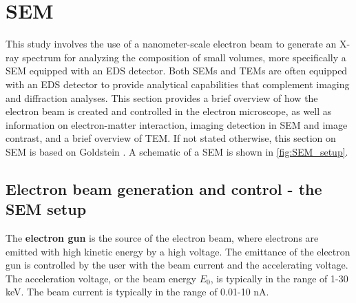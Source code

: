 


























\clearpage

\section{SEM}
\label{theory:sem}

This study involves the use of a nanometer-scale electron beam to generate an X-ray spectrum for analyzing the composition of small volumes, more specifically a SEM equipped with an EDS detector.
Both SEMs and TEMs are often equipped with an EDS detector to provide analytical capabilities that complement imaging and diffraction analyses.
This section provides a brief overview of how the electron beam is created and controlled in the electron microscope, as well as information on electron-matter interaction, imaging detection in SEM and image contrast, and a brief overview of TEM.
If not stated otherwise, this section on SEM is based on Goldstein \cite{goldstein_scanning_2018}.
A schematic of a SEM is shown in \cref{fig:SEM_setup}.


\subsection{Electron beam generation and control - the SEM setup}
\label{theory:sem:setup}

The \textbf{electron gun} is the source of the electron beam, where electrons are emitted with high kinetic energy by a high voltage.
The emittance of the electron gun is controlled by the user with the beam current and the accelerating voltage.
The acceleration voltage, or the beam energy $E_0$, is typically in the range of 1-30 keV.
The beam current is typically in the range of 0.01-10 nA.


